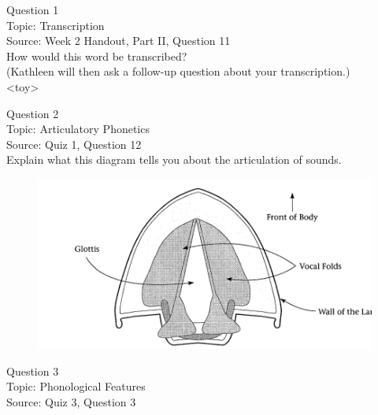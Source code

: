 \documentclass[12pt]{article}
\begin{document}
\begin{center}
\textbf{{\color{blue}{\HUGE START OF EXAM\\}}}

\textbf{{\color{blue}{\HUGE Student ID: 39207\\}}}

\textbf{{\color{blue}{\HUGE \\}}}

\end{center}
\newpage

{\large Question 1}\\

Topic: Transcription\\
Source: Week 2 Handout, Part II, Question 11\\

How would this word be transcribed?\\ (Kathleen will then ask a follow-up question about your transcription.)\\

<toy>


\newpage

{\large Question 2}\\

Topic: Articulatory Phonetics\\
Source: Quiz 1, Question 12\\

Explain what this diagram tells you about the articulation of sounds.\\

\begin{figure}[H]
\includegraphics{../images/spreadglottis_diagram.png}
\end{figure}

\newpage

{\large Question 3}\\

Topic: Phonological Features\\
Source: Quiz 3, Question 3\\
\end{document}
